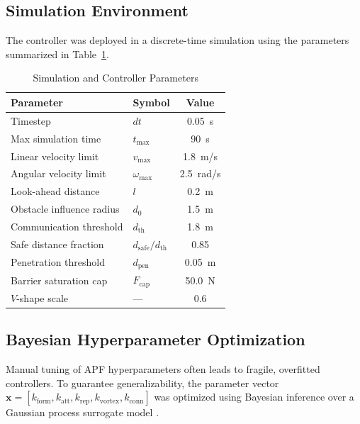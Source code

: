 \documentclass[letterpaper, 10 pt, journal, twoside]{IEEEtran}
\begin{document}
\subsection{Simulation Environment}
The controller was deployed in a discrete-time simulation using the
parameters summarized in Table~\ref{tab:params}.

\begin{table}[h]
\centering
\caption{Simulation and Controller Parameters}
\label{tab:params}
\renewcommand{\arraystretch}{1.2}
\begin{tabular}{llc}
\toprule
Parameter & Symbol & Value \\
\midrule
Timestep              & $dt$                    & 0.05~s       \\
Max simulation time   & $t_{\max}$              & 90~s         \\
Linear velocity limit & $v_{\max}$              & 1.8~m/s      \\
Angular velocity limit& $\omega_{\max}$         & 2.5~rad/s    \\
Look-ahead distance   & $l$                     & 0.2~m        \\
Obstacle influence radius & $d_{0}$             & 1.5~m        \\
Communication threshold   & $d_{\mathrm{th}}$   & 1.8~m        \\
Safe distance fraction    & $d_{\mathrm{safe}}/d_{\mathrm{th}}$ & 0.85 \\
Penetration threshold & $d_{\mathrm{pen}}$      & 0.05~m       \\
Barrier saturation cap& $F_{\mathrm{cap}}$      & 50.0~N       \\
$V$-shape scale       & ---                     & 0.6          \\
\bottomrule
\end{tabular}
\end{table}

\subsection{Bayesian Hyperparameter Optimization}
Manual tuning of APF hyperparameters often leads to fragile, overfitted
controllers.  To guarantee generalizability, the parameter vector
$\mathbf{x}=[k_{\mathrm{form}},k_{\mathrm{att}},k_{\mathrm{rep}},
k_{\mathrm{vortex}},k_{\mathrm{conn}}]$ was optimized using Bayesian
inference over a Gaussian process surrogate model \cite{shahriari2016JMLR}.
\end{document}
